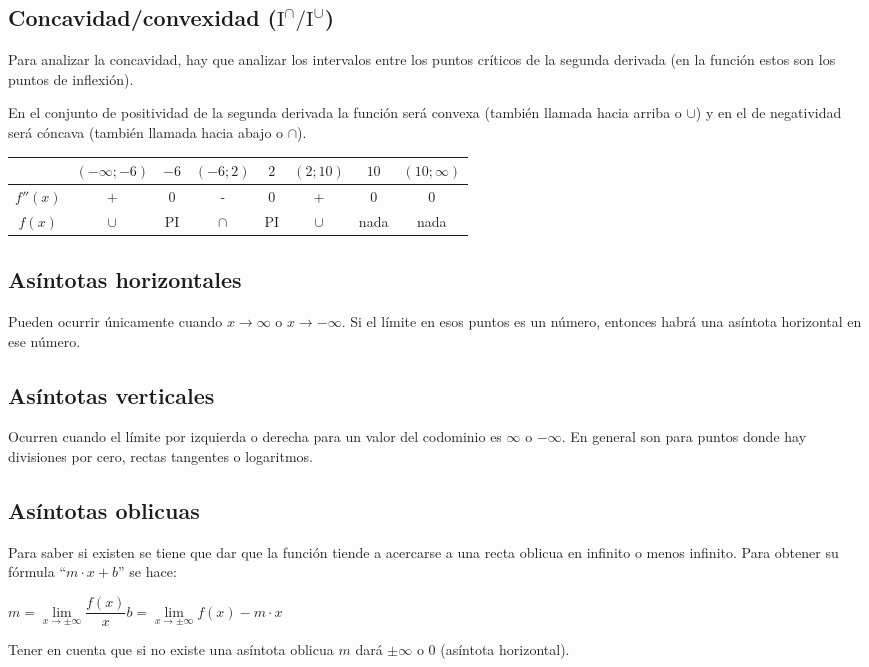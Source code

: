 \subsection*{Concavidad/convexidad ($\text{I}^\cap/\text{I}^\cup$)}

Para analizar la concavidad, hay que analizar los intervalos entre los puntos críticos de la segunda derivada (en la función estos son los puntos de inflexión).

En el conjunto de positividad de la segunda derivada la función será convexa (también llamada hacia arriba o $\cup$) y en el de negatividad será cóncava (también llamada hacia abajo o $\cap$).

{\renewcommand{\arraystretch}{1.25}
\begin{table}[H]
\centering
\begin{tabular}{|c|c|c|c|c|c|c|c|}
\hline
&
\multicolumn{1}{c|}{$(-\infty ; -6)$} & 
\multicolumn{1}{c|}{$-6$} & 
\multicolumn{1}{c|}{$(-6 ; 2)$} & 
$2$ & 
$(2; 10)$ & $10$ & $(10; \infty)$\\ \hline
$f''(x)$ & $+$ & 0 & - & 0 & + & 0 & 0\\ \hline
$f(x)$ &  $\cup$ & PI & $\cap$ & PI & $\cup$ & nada & nada\\ \hline
\end{tabular}
\end{table}
}


\subsection*{Asíntotas horizontales}

Pueden ocurrir únicamente cuando $x\rightarrow \infty$ o $x\rightarrow -\infty$. Si el límite en esos puntos es un número, entonces habrá una asíntota horizontal en ese número.


\subsection*{Asíntotas verticales}

Ocurren cuando el límite por izquierda o derecha para un valor del codominio es $\infty$ o $-\infty$. En general son para puntos donde hay divisiones por cero, rectas tangentes o logaritmos.

\newpage
\subsection*{Asíntotas oblicuas}

Para saber si existen se tiene que dar que la función tiende a acercarse a una recta oblicua en infinito o menos infinito. Para obtener su fórmula ``$m\cdot x + b$'' se hace:

\skipline
\hfil$m = \lim\limits_{x\rightarrow \pm\infty} \dfrac{f(x)}{x}$\hfil$b = \lim\limits_{x\rightarrow \pm \infty} f(x) - m\cdot x$\hfil

\skipline
\noindent
Tener en cuenta que si no existe una asíntota oblicua $m$ dará $\pm\infty$ o 0 (asíntota horizontal).

